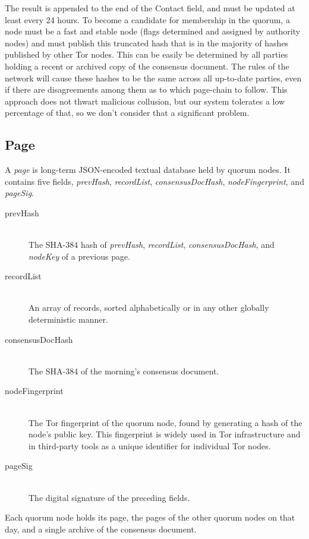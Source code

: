 The result is appended to the end of the Contact field, and must be updated at least every 24 hours. To become a candidate for membership in the quorum, a node must be a fast and stable node (flags determined and assigned by authority nodes) and must publish this truncated hash that is in the majority of hashes published by other Tor nodes. This can be easily be determined by all parties holding a recent or archived copy of the consensus document. The rules of the network will cause these hashes to be the same across all up-to-date parties, even if there are disagreements among them as to which page-chain to follow. This approach does not thwart malicious collusion, but our system tolerates a low percentage of that, so we don't consider that a significant problem.

\subsection{Page}

A \emph{page} is long-term JSON-encoded textual database held by quorum nodes. It contains five fields, \emph{prevHash}, \emph{recordList}, \emph{consensusDocHash}, \emph{nodeFingerprint}, and \emph{pageSig}. 

\begin{description}
	\item[prevHash] \hfill \\
		The SHA-384 hash of \emph{prevHash}, \emph{recordList}, \emph{consensusDocHash}, and \emph{nodeKey} of a previous page.
	\item[recordList] \hfill \\
		An array of records, sorted alphabetically or in any other globally deterministic manner.
	\item[consensusDocHash] \hfill \\
		The SHA-384 of the morning's consensus document.
	\item[nodeFingerprint] \hfill \\
		The Tor fingerprint of the quorum node, found by generating a hash of the node's public key. This fingerprint is widely used in Tor infrastructure and in third-party tools as a unique identifier for individual Tor nodes.
	\item[pageSig] \hfill \\
		The digital signature of the preceding fields.
\end{description}

Each quorum node holds its page, the pages of the other quorum nodes on that day, and a single archive of the consensus document. 

